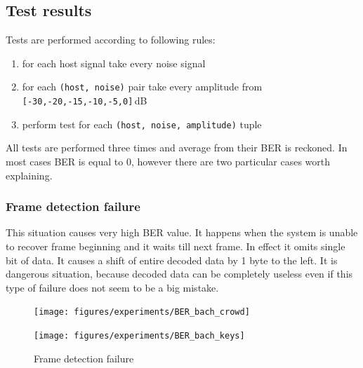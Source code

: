 \documentclass[english,bachelor,a4paper,oneside]{ppfcmthesis}
\begin{document}
\subsection{Test results}
Tests are performed according to following rules:
\begin{enumerate}
  \item for each host signal take every noise signal
  \item for each \verb|(host, noise)| pair take every amplitude from \verb|[-30,-20,-15,-10,-5,0]|\,\mbox{dB}
  \item perform test for each \verb|(host, noise, amplitude)| tuple
\end{enumerate}
All tests are performed three times and average from their BER is reckoned. In most cases BER is equal to 0, however there
are two particular cases worth explaining.

\subsubsection{Frame detection failure}
\label{subsub:frame-detection}
This situation causes very high BER value. It happens when the system is unable to recover frame beginning and it waits till next frame.
In effect it omits single bit of data. It causes a shift of entire decoded data by 1 byte to the left. It is dangerous situation, because decoded data
can be completely useless even if this type of failure does not seem to be a big mistake.
\begin{figure}[hb]
\begin{minipage}[b]{0.45\textwidth}
  \texttt{[image: figures/experiments/BER\_bach\_crowd]}
\end{minipage}\hfill
\begin{minipage}[b]{0.45\textwidth}
  \texttt{[image: figures/experiments/BER\_bach\_keys]}
\end{minipage}\hfill
\label{fig:frame-failure}
\caption{Frame detection failure}
\end{figure}

\clearpage
\end{document}
